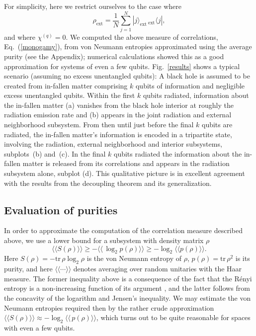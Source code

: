 \documentclass[aps,12pt]{revtex4}
\begin{document}
For simplicity, here we restrict ourselves to the case where
\begin{equation}
\rho_{\text{ext}}=\frac{1}{N}\sum_{j=1}^N
 |j\rangle_{\text{ext}}\,{}_{\text{ext}}\!\langle j|,
\end{equation}
and where $\chi^{(q)}=0$. We computed the above measure of correlations,
Eq.~(\ref{monogamy}), from von Neumann entropies approximated using the
average purity (see the Appendix); numerical
calculations showed this as a good approximation for systems of even a
few qubits. Fig.~\ref{results} shows a typical scenario (assuming no
excess unentangled qubits): A black hole is assumed to be
created from in-fallen matter comprising $k$ qubits of information and
negligible excess unentangled qubits. Within the first $k$ qubits
radiated, information about the in-fallen matter (a) vanishes from the
black hole interior at roughly the radiation emission rate and (b) appears
in the joint radiation and external neighborhood subsystem. From then
until just before the final $k$ qubits are radiated, the in-fallen
matter's information is encoded in a tripartite state, involving the
radiation, external neighborhood and interior subsystems, subplots~(b)
and~(c). In the final $k$ qubits radiated the information about the
in-fallen matter is released from its correlations and appears in the
radiation subsystem alone, subplot (d). This qualitative picture is
in excellent agreement with the results from the decoupling
theorem and its generalization.

\subsection*{Evaluation of purities}
\label{purities}

In order to approximate the computation of the correlation measure
described above, we use a lower bound for a subsystem with
density matrix $\rho$
\begin{equation}
\langle\!\langle S(\rho) \rangle\!\rangle
\ge -\langle\!\langle \,\log_2 p(\rho) \rangle\!\rangle
\ge -\log_2 \langle\!\langle p(\rho) \rangle\!\rangle. %
\end{equation}
Here $S(\rho)=-{\text{tr}}\, \rho \log_2 \rho$ is the von Neumann entropy
of $\rho$, $p(\rho)= {\text{tr}}\, \rho^2$ is its purity, and here
$\langle\!\langle \cdots \rangle\!\rangle$ denotes averaging over
random unitaries with the Haar measure. The former inequality above is
a consequence of the fact that the R\'enyi entropy is a non-increasing
function of its argument \cite{ap1}, and the latter follows from the
concavity of the logarithm and Jensen's inequality. We may estimate
the von Neumann entropies required then by the rather crude
approximation
$\langle\!\langle S(\rho) \rangle\!\rangle
\approx -\log_2 \langle\!\langle \,p(\rho) \rangle\!\rangle$, 
which turns out to be quite reasonable for spaces with even a few qubits.
\end{document}
